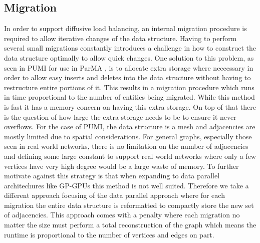 \documentclass[a4paper]{article}
\begin{document}
\subsection{Migration}
In order to support diffusive load balancing, an internal migration procedure is required to allow iterative changes of the data structure. Having to perform several small migrations constantly introduces a challenge in how to construct the data structure optimally to allow quick changes. One solution to this problem, as seen in PUMI for use in ParMA \cite{ibanez2016pumi}, is to allocate extra storage where neccessary in order to allow easy inserts and deletes into the data structure without having to restructure entire portions of it. This results in a migration procedure which runs in time proportional to the number of entities being migrated. While this method is fast it has a memory concern on having this extra storage. On top of that there is the question of how large the extra storage needs to be to ensure it never overflows. For the case of PUMI, the data structure is a mesh and adjacencies are mostly limited due to spatial considerations. For general graphs, especially those seen in real world networks, there is no limitation on the number of adjacencies and defining some large constant to support real world networks where only a few vertices have very high degree would be a large waste of memory. To further motivate against this strategy is that when expanding to data parallel architechures like GP-GPUs this method is not well suited. Therefore we take a different approach focusing of the data parallel approach where for each migration the entire data structure is reformatted to compactly store the new set of adjacencies. This approach comes with a penalty where each migration no matter the size must perform a total reconstruction of the graph which means the runtime is proportional to the number of vertices and edges on part.
\end{document}
